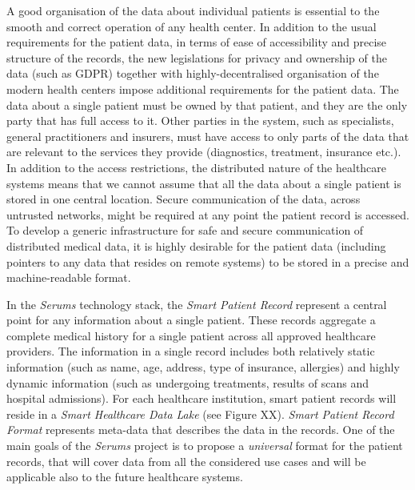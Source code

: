 


\noindent
A good organisation of the data about individual patients is essential to the smooth and correct operation of any health center. In addition to the usual requirements for the patient data, in terms of ease of accessibility and precise structure of the records, the new legislations for privacy and ownership of the data (such as GDPR) together with highly-decentralised organisation of the modern health centers impose additional requirements for the patient data. The data about a single patient must be owned by that patient, and they are the only party that has full access to it. Other parties in the system, such as specialists, general practitioners and insurers, must have access to only parts of the data that are relevant to the services they provide (diagnostics, treatment, insurance etc.). In addition to the access restrictions, the distributed nature of the healthcare systems means that we cannot assume that all the data about a single patient is stored in one central location. Secure communication of the data, across untrusted networks, might be required at any point the patient record is accessed. To develop a generic infrastructure for safe and secure communication of distributed medical data, it is highly desirable for the patient data (including pointers to any data that resides on remote systems) to be stored in a precise and machine-readable format.

In the \emph{Serums} technology stack, the \emph{Smart Patient Record} represent a central point for any information about a single patient. These records aggregate a complete medical history for a single patient across all approved healthcare providers. The information in a single record includes both relatively static information (such as name, age, address, type of insurance, allergies) and highly dynamic information (such as undergoing treatments, results of scans and hospital admissions). For each healthcare institution, smart patient records will reside in a \emph{Smart Healthcare Data Lake} (see Figure XX). \emph{Smart Patient Record Format} represents meta-data that describes the data in the records. One of the main goals of the \emph{Serums} project is to propose a \emph{universal} format for the patient records, that will cover data from all the considered use cases and will be applicable also to the future healthcare systems.

